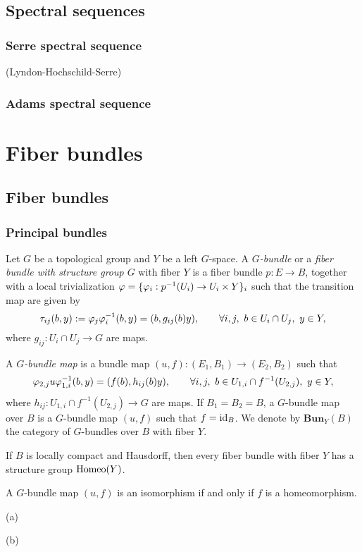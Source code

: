 \documentclass{../../large}
\begin{document}
\chapter{Spectral sequences}
\section{Serre spectral sequence}
	(Lyndon-Hochschild-Serre)
\section{Adams spectral sequence}











\part{Fiber bundles}




\chapter{Fiber bundles}


\section{Principal bundles}

\begin{prb}
Let $G$ be a topological group and $Y$ be a left $G$-space.
A \emph{$G$-bundle} or a \emph{fiber bundle with structure group $G$} with fiber $Y$ is a fiber bundle $p:E\to B$, together with a local trivialization $\varphi=\{\varphi_i:p^{-1}(U_i)\to U_i\times Y\}_i$ such that the transition map are given by
\[\tau_{ij}(b,y):=\varphi_j\varphi_i^{-1}(b,y)=(b,g_{ij}(b)y),
\qquad\forall i,j,\ b\in U_i\cap U_j,\ y\in Y,\]
where $g_{ij}:U_i\cap U_j\to G$ are maps.

A \emph{$G$-bundle map} is a bundle map $(u,f):(E_1,B_1)\to(E_2,B_2)$ such that
\[\varphi_{2,j}u\varphi_{1,i}^{-1}(b,y)=(f(b),h_{ij}(b)y),
\qquad\forall i,j,\ b\in U_{1,i}\cap f^{-1}(U_{2,j}),\ y\in Y,\]
where $h_{ij}:U_{1,i}\cap f^{-1}(U_{2,j})\to G$ are maps.
If $B_1=B_2=B$, a $G$-bundle map over $B$ is a $G$-bundle map $(u,f)$ such that $f=\operatorname{id}_B$.
We denote by $\mathbf{Bun}_Y(B)$ the category of $G$-bundles over $B$ with fiber $Y$.
\begin{parts}
\item If $B$ is locally compact and Hausdorff, then every fiber bundle with fiber $Y$ has a structure group $\operatorname{Homeo}(Y)$.
\item A $G$-bundle map $(u,f)$ is an isomorphism if and only if $f$ is a homeomorphism.
\end{parts}
\end{prb}
\begin{pf}
(a)

(b) 
\end{pf}
\end{document}

